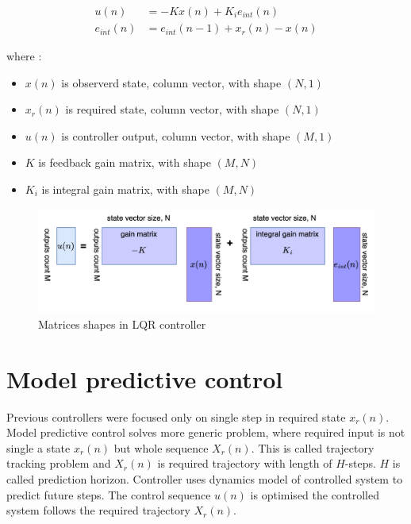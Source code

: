 \documentclass[12pt,twoside,onecolumn,openany,extrafontsizes,dvipsnames]{memoir}
\begin{document}
        \begin{align}
            u(n)&= -Kx(n) + K_ie_{int}(n) \label{eq:lqr_integral_action} \\
            e_{int}(n)& = e_{int}(n-1) + x_r(n) - x(n)
        \end{align}

        where : 
        \begin{itemize}
            \item $x(n)$ is observerd state, column vector, with shape $(N, 1)$
            \item $x_r(n)$ is required state, column vector, with shape $(N, 1)$
            \item $u(n)$ is controller output, column vector, with shape $(M, 1)$
            \item $K$ is feedback gain matrix, with shape $(M, N)$
            \item $K_i$ is integral gain matrix, with shape $(M, N)$ 
        \end{itemize}


        \begin{figure}[!htb]
            \centering
            \includegraphics[scale=0.8]{../diagrams/control_generic/control_generic-lqr_detail.png}
            \caption{Matrices shapes in LQR controller}
            \label{fig:control_lqr_matrices_shape}
        \end{figure}
        
    \newpage
    \section{Model predictive control}

        Previous controllers were focused only on single step in required state $x_r(n)$.
        Model predictive control solves more generic problem, where required input 
        is not single a state $x_r(n)$ but whole sequence $X_r(n)$. 
        This is called trajectory tracking problem and $X_r(n)$ is required trajectory with length of $H$-steps.
        $H$ is called prediction horizon. Controller uses dynamics model of controlled system to predict
        future steps. The control sequence $u(n)$ is optimised the controlled system follows the required 
        trajectory $X_r(n)$.
\end{document}
